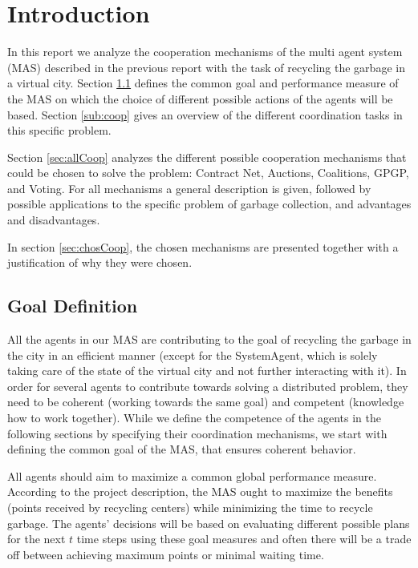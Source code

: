 \section{Introduction}

In this report we analyze the cooperation mechanisms of the multi agent system (MAS) described in the previous report with the task of recycling the garbage in a virtual city. Section \ref{sub:goal} defines the common goal and performance measure of the MAS on which the choice of different possible actions of the agents will be based. Section \ref{sub:coop} gives an overview of the different coordination tasks in this specific problem.

Section \ref{sec:allCoop} analyzes the different possible cooperation mechanisms that could be chosen to solve the problem: Contract Net, Auctions, Coalitions, GPGP, and Voting. For all mechanisms a general description is given, followed by possible applications to the specific problem of garbage collection, and advantages and disadvantages.

In section \ref{sec:chosCoop}, the chosen mechanisms are presented together with a justification of why they were chosen.

\subsection{Goal Definition}
\label{sub:goal}

All the agents in our MAS are contributing to the goal of recycling the garbage in the city in an efficient manner (except for the SystemAgent, which is solely taking care of the state of the virtual city and not further interacting with it). In order for several agents to contribute towards solving a distributed problem, they need to be coherent (working towards the same goal) and competent (knowledge how to work together). While we define the competence of the agents in the following sections by specifying their coordination mechanisms, we start with defining the common goal of the MAS, that ensures coherent behavior. 

All agents should aim to maximize a common global performance measure. According to the project description, the MAS ought to maximize the benefits (points received by recycling centers) while minimizing the time to recycle garbage. The agents' decisions will be based on evaluating different possible plans for the next $t$ time steps using these goal measures and often there will be a trade off between achieving maximum points or minimal waiting time. 

